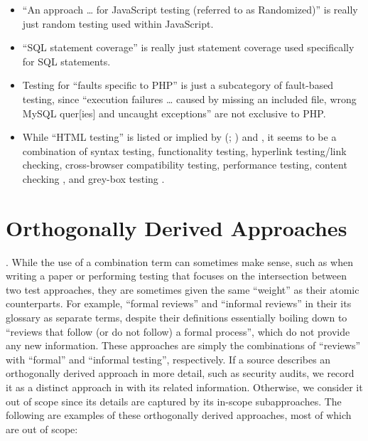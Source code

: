 \begin{itemize}
    \item ``An approach \dots{} for JavaScript testing
          (referred to as Randomized)'' \citep[p.~192]{DoğanEtAl2014} is
          really just random testing used within JavaScript.
    \item ``SQL statement coverage'' \citep[Tab.~13]{DoğanEtAl2014}%
           is really just statement coverage
          used specifically for SQL statements.
    \item Testing for ``faults specific to PHP'' is just a subcategory of
          fault-based testing, since ``execution failures \dots{} caused by
          missing an included file, wrong MySQL quer[ies] and uncaught
          exceptions'' \citep[Tab.~27]{DoğanEtAl2014}
          are not exclusive to PHP.
    \item While ``HTML testing'' is listed or implied by
          \citeauthor{Gerrard2000a} (\citeyear[Tab.~2]{Gerrard2000a};
          \citeyear[Tab.~1, p.~3]{Gerrard2000b}) and
          \citet[p.~220]{Patton2006}, it seems to be a combination of syntax
          testing, functionality testing, hyperlink testing/link checking,
          cross-browser compatibility testing, performance testing,
          content checking \citep[p.~3]{Gerrard2000b}, and grey-box testing
          \citep[pp.~218\==220]{Patton2006}.
\end{itemize}

\section{Orthogonally Derived Approaches}\label{orth-test}
\orthTestIntro. While the use of a combination term can sometimes
make sense, such as when writing a paper or performing testing that focuses
on the intersection between two test approaches, they are sometimes given
the same ``weight'' as their atomic counterparts. For example, \citetISTQB{}
 ``formal reviews'' and ``informal reviews'' in
\ifnotpaper their \else its \fi glossary as separate terms, despite their
definitions essentially boiling down to ``reviews that follow (or do not
follow) a formal process'', which do not provide any new information.
These approaches are simply the combinations of ``reviews'' with ``formal''
and ``informal testing'', respectively. If a source describes an orthogonally
derived approach in more detail, such as security audits, we record it as a
distinct approach in \ourApproachGlossary{} with its related information.
Otherwise, we consider it out of scope since its details are captured by its
in-scope subapproaches. The following are examples of these orthogonally
derived approaches, most of which are out of scope:

